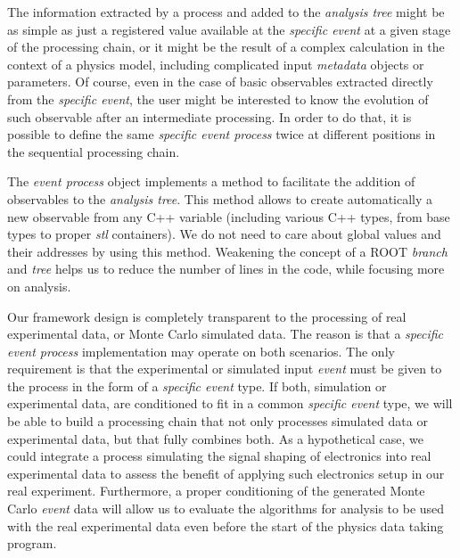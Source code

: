The information extracted by a process and added to the \emph{analysis tree} might be as simple as just a registered value available at the \emph{specific event} at a given stage of the processing chain, or it might be the result of a complex calculation in the context of a physics model, including complicated input \emph{metadata} objects or parameters. Of course, even in the case of basic observables extracted directly from the \emph{specific event}, the user might be interested to know the evolution of such observable after an intermediate processing. In order to do that, it is possible to define the same \emph{specific event process} twice at different positions in the sequential processing chain.




The \emph{event process} object implements a method to facilitate the addition of observables to the \emph{analysis tree}. This method allows to create automatically a new observable from any C++ variable (including various C++ types, from base types to proper \emph{stl} containers). We do not need to care about global values and their addresses by using this method. Weakening the concept of a ROOT \emph{branch} and \emph{tree} helps us to reduce the number of lines in the code, while focusing more on analysis.

Our framework design is completely transparent to the processing of real experimental data, or Monte Carlo simulated data. The reason is that a \emph{specific event process} implementation may operate on both scenarios. The only requirement is that the experimental or simulated input \emph{event} must be given to the process in the form of a \emph{specific event} type. If both, simulation or experimental data, are conditioned to fit in a common \emph{specific event} type, we will be able to build a processing chain that not only processes simulated data or experimental data, but that fully combines both. As a hypothetical case, we could integrate a process simulating the signal shaping of electronics into real experimental data to assess the benefit of applying such electronics setup in our real experiment. Furthermore, a proper conditioning of the generated Monte Carlo \emph{event} data will allow us to evaluate the algorithms for analysis to be used with the real experimental data even before the start of the physics data taking program.

